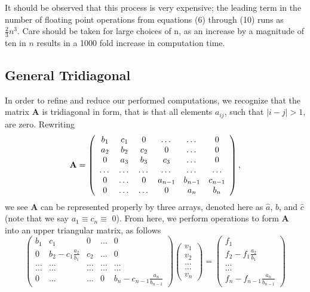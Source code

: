\documentclass[11pt,a4paper]{article}
\begin{document}
It should be observed that this process is very expensive; the leading term in the number of floating point operations from equations (6) through (10) runs as ~ $\frac{2}{3}n^3$. Care should be taken for large choices of n, as an increase by a magnitude of ten in $n$ results in a 1000 fold increase in computation time.

\subsection{General Tridiagonal}

In order to refine and reduce our performed computations, we recognize that the matrix {\bf A} is tridiagonal in form, that is that all elements $a_{ij}$, such that $|i-j|>1$, are zero. Rewriting
\begin{equation*}
{\bf A} = \left(\begin{array}{cccccc}
			b_1 & c_1 & 0 & \dots & \dots & 0 \\
			a_2 & b_2 & c_2 & 0 & \dots & 0 \\
			0 & a_3 & b_3 & c_3 & \dots & 0 \\
			\dots & \dots & \dots & \dots & \dots & \dots \\
			0 & \dots & 0 & a_{n-1} & b_{n-1} & c_{n-1} \\
			0 & \dots & \dots & 0 & a_n & b_n \end{array} \right),
\end{equation*}
we see {\bf A} can be represented properly by three arrays, denoted here as $\hat{a}$, $\hat{b}$, and $\hat{c}$ (note that we say $a_1 \equiv c_n \equiv$ 0). From here, we perform operations to form {\bf A} into an upper triangular matrix, as follows
\begin{equation*}
\left(\begin{array}{ccccc}
			b_1 & c_1 & 0 & \dots & 0 \\
			0 & b_2 - c_1\frac{a_2}{b_1} & c_2 & \dots & 0 \\
			\dots & \dots & \dots & \dots & \dots \\
			\dots & \dots & \dots & \dots & \dots \\
			0 & \dots & \dots & 0 & b_n - c_{n-1}\frac{a_n}{b_{n-1}} \end{array} \right)
		\left(\begin{array}{c}
			v_1 \\
			v_2 \\
			\dots \\
			\dots \\
			v_n \end{array} \right)
		=\left(\begin{array}{c}
			f_1 \\
			f_2 - f_1\frac{a_2}{b_1} \\
			\dots \\
			\dots \\
			f_n - f_{n-1}\frac{a_n}{b_{n-1}} \end{array} \right)
\end{equation*}
\end{document}
